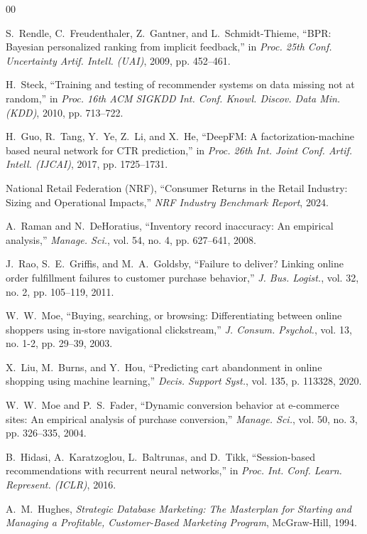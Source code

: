 \documentclass[conference]{IEEEtran}
\begin{document}
\begin{thebibliography}{00}

S.~Rendle, C.~Freudenthaler, Z.~Gantner, and L.~Schmidt-Thieme, ``BPR: Bayesian personalized ranking from implicit feedback,'' in \emph{Proc. 25th Conf. Uncertainty Artif. Intell. (UAI)}, 2009, pp. 452--461.

H.~Steck, ``Training and testing of recommender systems on data missing not at random,'' in \emph{Proc. 16th ACM SIGKDD Int. Conf. Knowl. Discov. Data Min. (KDD)}, 2010, pp. 713--722.

H.~Guo, R.~Tang, Y.~Ye, Z.~Li, and X.~He, ``DeepFM: A factorization-machine based neural network for CTR prediction,'' in \emph{Proc. 26th Int. Joint Conf. Artif. Intell. (IJCAI)}, 2017, pp. 1725--1731.

National Retail Federation (NRF), ``Consumer Returns in the Retail Industry: Sizing and Operational Impacts,'' \emph{NRF Industry Benchmark Report}, 2024.

A.~Raman and N.~DeHoratius, ``Inventory record inaccuracy: An empirical analysis,'' \emph{Manage. Sci.}, vol. 54, no. 4, pp. 627--641, 2008.

J.~Rao, S.~E.~Griffis, and M.~A.~Goldsby, ``Failure to deliver? Linking online order fulfillment failures to customer purchase behavior,'' \emph{J. Bus. Logist.}, vol. 32, no. 2, pp. 105--119, 2011.

W.~W.~Moe, ``Buying, searching, or browsing: Differentiating between online shoppers using in-store navigational clickstream,'' \emph{J. Consum. Psychol.}, vol. 13, no. 1-2, pp. 29--39, 2003.

X.~Liu, M.~Burns, and Y.~Hou, ``Predicting cart abandonment in online shopping using machine learning,'' \emph{Decis. Support Syst.}, vol. 135, p. 113328, 2020.

W.~W.~Moe and P.~S.~Fader, ``Dynamic conversion behavior at e-commerce sites: An empirical analysis of purchase conversion,'' \emph{Manage. Sci.}, vol. 50, no. 3, pp. 326--335, 2004.

B.~Hidasi, A.~Karatzoglou, L.~Baltrunas, and D.~Tikk, ``Session-based recommendations with recurrent neural networks,'' in \emph{Proc. Int. Conf. Learn. Represent. (ICLR)}, 2016.

A.~M.~Hughes, \emph{Strategic Database Marketing: The Masterplan for Starting and Managing a Profitable, Customer-Based Marketing Program}, McGraw-Hill, 1994.


\end{thebibliography}
\end{document}
